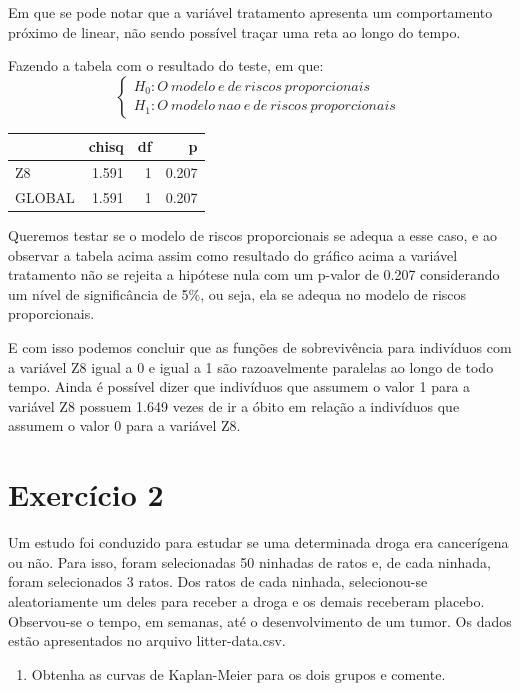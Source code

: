\documentclass[]{article}
\providecommand{\tightlist}{%
  \setlength{\itemsep}{0pt}\setlength{\parskip}{0pt}}
\begin{document}
Em que se pode notar que a variável tratamento apresenta um
comportamento próximo de linear, não sendo possível traçar uma reta ao
longo do tempo.

Fazendo a tabela com o resultado do teste, em que:
\[ \left\{ \begin{array}{ll}
H_0: O \ modelo \ e \ de \ riscos \ proporcionais \\
H_1: O \ modelo \ nao \ e \ de \ riscos \ proporcionais  \end{array} \right.\ \]

\begin{longtable}[]{@{}lrrr@{}}
\toprule
& chisq & df & p\tabularnewline
\midrule
\endhead
Z8 & 1.591 & 1 & 0.207\tabularnewline
GLOBAL & 1.591 & 1 & 0.207\tabularnewline
\bottomrule
\end{longtable}

Queremos testar se o modelo de riscos proporcionais se adequa a esse
caso, e ao observar a tabela acima assim como resultado do gráfico acima
a variável tratamento não se rejeita a hipótese nula com um p-valor de
0.207 considerando um nível de significância de 5\%, ou seja, ela se
adequa no modelo de riscos proporcionais.

E com isso podemos concluir que as funções de sobrevivência para
indivíduos com a variável Z8 igual a 0 e igual a 1 são razoavelmente
paralelas ao longo de todo tempo. Ainda é possível dizer que indivíduos
que assumem o valor 1 para a variável Z8 possuem 1.649 vezes de ir a
óbito em relação a indivíduos que assumem o valor 0 para a variável Z8.

\newpage

\section{Exercício 2}\label{exercicio-2}

Um estudo foi conduzido para estudar se uma determinada droga era
cancerígena ou não. Para isso, foram selecionadas 50 ninhadas de ratos
e, de cada ninhada, foram selecionados 3 ratos. Dos ratos de cada
ninhada, selecionou-se aleatoriamente um deles para receber a droga e os
demais receberam placebo. Observou-se o tempo, em semanas, até o
desenvolvimento de um tumor. Os dados estão apresentados no arquivo
litter-data.csv.

\begin{enumerate}
\def\labelenumi{(\alph{enumi})}
\tightlist
\item
  Obtenha as curvas de Kaplan-Meier para os dois grupos e comente.
\end{enumerate}
\end{document}
